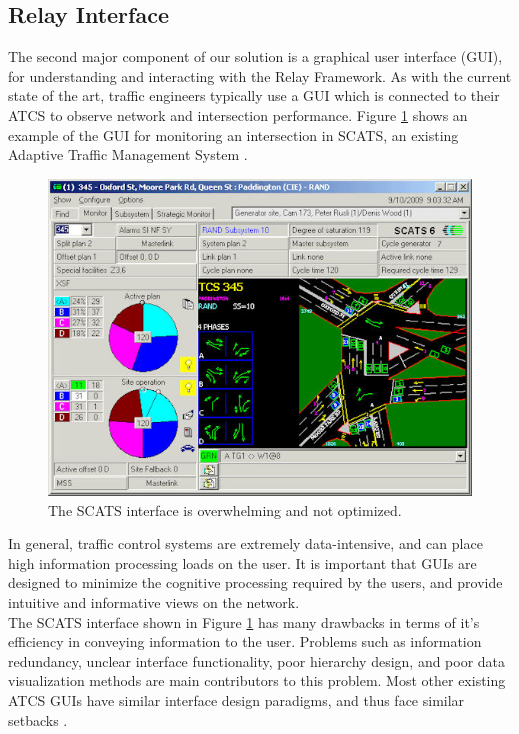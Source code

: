 \documentclass{article}
\begin{document}
\subsection{Relay Interface}
The second major component of our solution is a graphical user interface (GUI), for understanding and interacting with the Relay Framework.
As with the current state of the art, traffic engineers typically use a GUI which is connected to their ATCS to observe network and intersection performance.
Figure \ref{fig:scats-screenshot} shows an example of the GUI for monitoring an intersection in SCATS, an existing Adaptive Traffic Management System \cite{scats}.\\

\begin{figure}[htbp!]
  \begin{centering}
    \includegraphics[scale=0.8]{figures/scat-screen.jpg}
    \caption{The SCATS interface is overwhelming and not optimized.}
    \label{fig:scats-screenshot}
  \end{centering}
\end{figure}

In general, traffic control systems are extremely data-intensive, and can place high information processing loads on the user.
It is important that GUIs are designed to minimize the cognitive processing required by the users, and provide intuitive and informative views on the network.\\

The SCATS interface shown in Figure \ref{fig:scats-screenshot} has many drawbacks in terms of it's efficiency in conveying information to the user.
Problems such as information redundancy, unclear interface functionality, poor hierarchy design, and poor data visualization methods are main contributors to this problem.
Most other existing ATCS GUIs have similar interface design paradigms, and thus face similar setbacks \cite{la-atcs-brochure}.\\
\end{document}
